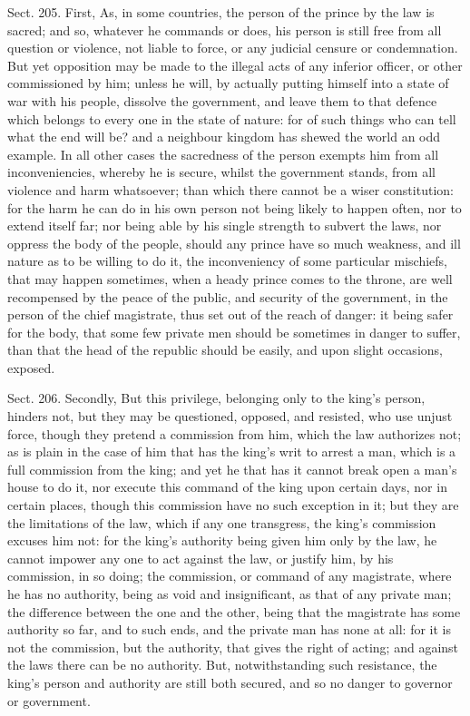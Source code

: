 \documentclass[11pt,openany]{book}
\begin{document}
Sect. 205. First, As, in some countries, the person of the prince by the law is sacred; and so, whatever he commands or does, his person is still free from all question or violence, not liable to force, or any judicial censure or condemnation. But yet opposition may be made to the illegal acts of any inferior officer, or other commissioned by him; unless he will, by actually putting himself into a state of war with his people, dissolve the government, and leave them to that defence which belongs to every one in the state of nature: for of such things who can tell what the end will be? and a neighbour kingdom has shewed the world an odd example. In all other cases the sacredness of the person exempts him from all inconveniencies, whereby he is secure, whilst the government stands, from all violence and harm whatsoever; than which there cannot be a wiser constitution: for the harm he can do in his own person not being likely to happen often, nor to extend itself far; nor being able by his single strength to subvert the laws, nor oppress the body of the people, should any prince have so much weakness, and ill nature as to be willing to do it, the inconveniency of some particular mischiefs, that may happen sometimes, when a heady prince comes to the throne, are well recompensed by the peace of the public, and security of the government, in the person of the chief magistrate, thus set out of the reach of danger: it being safer for the body, that some few private men should be sometimes in danger to suffer, than that the head of the republic should be easily, and upon slight occasions, exposed.

Sect. 206. Secondly, But this privilege, belonging only to the king's person, hinders not, but they may be questioned, opposed, and resisted, who use unjust force, though they pretend a commission from him, which the law authorizes not; as is plain in the case of him that has the king's writ to arrest a man, which is a full commission from the king; and yet he that has it cannot break open a man's house to do it, nor execute this command of the king upon certain days, nor in certain places, though this commission have no such exception in it; but they are the limitations of the law, which if any one transgress, the king's commission excuses him not: for the king's authority being given him only by the law, he cannot impower any one to act against the law, or justify him, by his commission, in so doing; the commission, or command of any magistrate, where he has no authority, being as void and insignificant, as that of any private man; the difference between the one and the other, being that the magistrate has some authority so far, and to such ends, and the private man has none at all: for it is not the commission, but the authority, that gives the right of acting; and against the laws there can be no authority. But, notwithstanding such resistance, the king's person and authority are still both secured, and so no danger to governor or government.
\end{document}
